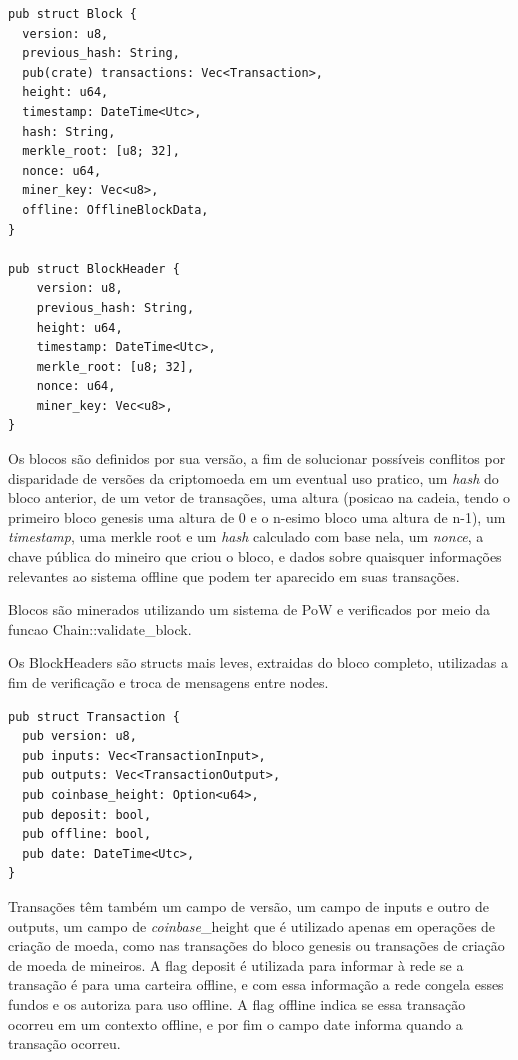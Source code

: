\documentclass[
  12pt,
  a4paper,
  oneside,
  article,
]{abntex2}
\begin{document}

\begin{verbatim}
pub struct Block {
  version: u8,
  previous_hash: String,
  pub(crate) transactions: Vec<Transaction>,
  height: u64,
  timestamp: DateTime<Utc>,
  hash: String,
  merkle_root: [u8; 32],
  nonce: u64,
  miner_key: Vec<u8>,
  offline: OfflineBlockData,
}

pub struct BlockHeader {
    version: u8,
    previous_hash: String,
    height: u64,
    timestamp: DateTime<Utc>,
    merkle_root: [u8; 32],
    nonce: u64,
    miner_key: Vec<u8>,
}

\end{verbatim}

Os blocos são definidos por sua versão, a fim de solucionar possíveis conflitos por disparidade de versões da criptomoeda em um eventual uso pratico, um \textit{hash} do bloco anterior, de um vetor de transações, uma altura (posicao na cadeia, tendo o primeiro bloco genesis uma altura de 0 e o n-esimo bloco uma altura de n-1), um \textit{timestamp}, uma merkle root e um \textit{hash} calculado com base nela, um \textit{nonce}, a chave pública do mineiro que criou o bloco, e dados sobre quaisquer informações relevantes ao sistema offline que podem ter aparecido em suas transações.

Blocos são minerados utilizando um sistema de PoW e verificados por meio da funcao Chain::validate\_block.

Os BlockHeaders são structs mais leves, extraidas do bloco completo, utilizadas a fim de verificação e troca de mensagens entre nodes.


\begin{verbatim}
pub struct Transaction {
  pub version: u8,
  pub inputs: Vec<TransactionInput>,
  pub outputs: Vec<TransactionOutput>,
  pub coinbase_height: Option<u64>,
  pub deposit: bool,
  pub offline: bool,
  pub date: DateTime<Utc>,
}
\end{verbatim}

Transações têm também um campo de versão, um campo de inputs e outro de outputs, um campo de \textit{coinbase}\_height que é utilizado apenas em operações de criação de moeda, como nas transações do bloco genesis ou transações de criação de moeda de mineiros. A flag deposit é utilizada para informar à rede se a transação é para uma carteira offline, e com essa informação a rede congela esses fundos e os autoriza para uso offline. A flag offline indica se essa transação ocorreu em um contexto offline, e por fim o campo date informa quando a transação ocorreu.
\end{document}
